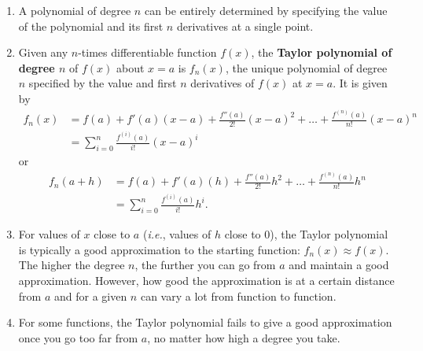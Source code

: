 \documentclass{article}
\begin{document}
\begin{enumerate}
	\item A polynomial of degree $n$ can be entirely determined by specifying the value of the polynomial and its first $n$ derivatives at a single point.
	\item Given any $n$-times differentiable function $f(x)$, the \textbf{Taylor polynomial of degree $n$} of $f(x)$ about $x=a$ is $f_n(x)$, the unique polynomial of degree $n$ specified by the value and first $n$ derivatives of $f(x)$ at $x=a$. It is given by
		\begin{align*}
			f_n(x)&=f(a)+f'(a)(x-a)+\frac{f''(a)}{2!}(x-a)^2+ \hdots +\frac{f^{(n)}(a)}{n!}(x-a)^n\\
			&=\sum_{i=0}^n \frac{f^{(i)}(a)}{i!}(x-a)^i
		\end{align*}
		or
		\begin{align*}
			f_n(a+h)&=f(a)+f'(a)(h)+\frac{f''(a)}{2!}h^2 + \hdots +\frac{f^{(n)}(a)}{n!}h^n\\
			&=\sum_{i=0}^n \frac{f^{(i)}(a)}{i!}h^i.
		\end{align*}
	\item For values of $x$ close to $a$ (\textit{i.e.}, values of $h$ close to 0), the Taylor polynomial is typically a good approximation to the starting function: $f_n(x)\approx f(x)$. The higher the degree $n$, the further you can go from $a$ and maintain a good approximation. However, how good the approximation is at a certain distance from $a$ and for a given $n$ can vary a lot from function to function.
	\item For some functions, the Taylor polynomial fails to give a good approximation once you go too far from $a$, no matter how high a degree you take.
\end{enumerate}
\end{document}
